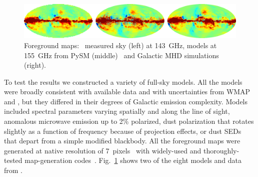 \documentclass[PICOReport.tex]{subfiles}
\begin{document}
\begin{figure}[t]
\begin{center}
\includegraphics[width=.95\textwidth]{images/foregrounds_maps_planck_models}
\vspace{-0.1in}
\caption{\captiontext
Foreground maps: \planck~measured sky (left) at 143~GHz, models at 155~GHz from PySM (middle)~\citep{thorne2018_pysm} and Galactic MHD simulations (right).  
\label{fig:pysm_foregrounds} }
\end{center} 
\vspace{-0.2in}
\end{figure}


To test the results we constructed a variety of  full-sky models. All the models were broadly consistent with available data and with uncertainties from WMAP and \planck , but they differed in their degrees of Galactic emission complexity. Models included spectral parameters varying spatially and along the line of sight, anomalous microwave emission up to 2\% polarized, dust polarization that rotates slightly as a function of frequency because of projection effects, or dust \ac{SED}s that depart from a simple modified blackbody. All the foreground maps were generated at native resolution of 7\arcmin\ pixels~\citep{gorski/etal:2005} with widely-used and thoroughly-tested map-generation codes~\citep{thorne2018_pysm,delabrouille/etal:2013}. Fig.~\ref{fig:pysm_foregrounds} shows two of the eight models and data from \planck . 
\end{document}
